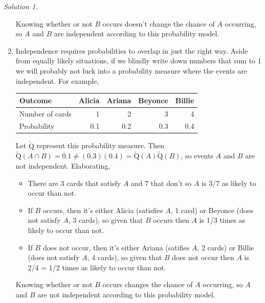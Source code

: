 \documentclass[
  letterpaper,
  DIV=11,
  numbers=noendperiod]{scrreprt}
\providecommand{\tightlist}{%
  \setlength{\itemsep}{0pt}\setlength{\parskip}{0pt}}
\theoremstyle{plain}
\theoremstyle{definition}
\theoremstyle{definition}
\theoremstyle{definition}
\theoremstyle{remark}
\newtheorem{refsolution}{Solution}[chapter]
\begin{document}
\begin{tcolorbox}
\begin{refsolution}
\begin{enumerate}
  Knowing whether or not \(B\) occurs doesn't change the chance of \(A\)
  occurring, so \(A\) and \(B\) are independent according to this
  probability model.
\item
  Independence requires probabilities to overlap in just the right way.
  Aside from equally likely situations, if we blindly write down numbers
  that sum to 1 we will probably not luck into a probability measure
  where the events are independent. For example,

  \begin{longtable}[]{@{}lrrrr@{}}
  \toprule\noalign{}
  Outcome & Alicia & Ariana & Beyonce & Billie \\
  \midrule\noalign{}
  \endhead
  \bottomrule\noalign{}
  \endlastfoot
  Number of cards & 1 & 2 & 3 & 4 \\
  Probability & 0.1 & 0.2 & 0.3 & 0.4 \\
  \end{longtable}

  Let \(\tilde{\textrm{Q}}\) represent this probability measure. Then
  \(\tilde{\textrm{Q}}(A \cap B) = 0.1 \neq (0.3)(0.4)=\tilde{\textrm{Q}}(A)\tilde{\textrm{Q}}(B)\),
  so events \(A\) and \(B\) are not independent. Elaborating,

  \begin{itemize}
  \tightlist
  \item
    There are 3 cards that satisfy \(A\) and 7 that don't so \(A\) is
    3/7 as likely to occur than not.
  \item
    If \(B\) occurs, then it's either Alicia (satisfies \(A\), 1 card)
    or Beyonce (does not satisfy \(A\), 3 cards), so given that \(B\)
    occurs then \(A\) is 1/3 times as likely to occur than not.
  \item
    If \(B\) does not occur, then it's either Ariana (satifies \(A\), 2
    cards) or Billie (does not satisfy \(A\), 4 cards), so given that
    \(B\) does not occur then \(A\) is 2/4 = 1/2 times as likely to
    occur than not.
  \end{itemize}

  Knowing whether or not \(B\) occurs changes the chance of \(A\)
  occurring, so \(A\) and \(B\) are not independent according to this
  probability model.
\end{enumerate}

\label{sol-independent-probmeasure}

\end{refsolution}

\end{tcolorbox}
\end{document}
